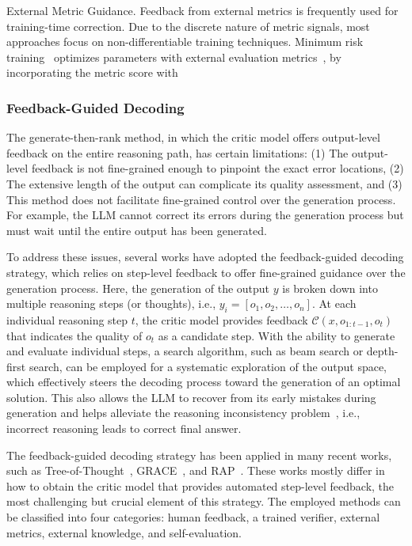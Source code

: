\documentclass[12pt]{extarticle}
\begin{document}
External Metric Guidance. Feedback from external metrics is frequently used for training-time correction. Due to the discrete nature of metric signals, most approaches focus on non-differentiable training techniques. Minimum risk training~\cite{shen-etal-2016-minimum} optimizes parameters with external evaluation metrics~\cite{xu-etal-2022-errors, xu-etal-2023-sescore2}, by incorporating the metric score with

\subsubsection{Feedback-Guided Decoding}
The generate-then-rank method, in which the critic model offers output-level feedback on the entire reasoning path, has certain limitations: (1) The output-level feedback is not fine-grained enough to pinpoint the exact error locations, (2) The extensive length of the output can complicate its quality assessment, and (3) This method does not facilitate fine-grained control over the generation process. For example, the LLM cannot correct its errors during the generation process but must wait until the entire output has been generated.

To address these issues, several works have adopted the feedback-guided decoding strategy, which relies on step-level feedback to offer fine-grained guidance over the generation process. Here, the generation of the output $y$ is broken down into multiple reasoning steps (or thoughts), i.e., $y_{i}=\left[o_{1}, o_{2}, \ldots, o_{n}\right]$. At each individual reasoning step $t$, the critic model provides feedback $\mathcal{C}\left(x, o_{1: t-1}, o_{t}\right)$ that indicates the quality of $o_{t}$ as a candidate step. With the ability to generate and evaluate individual steps, a search algorithm, such as beam search or depth-first search, can be employed for a systematic exploration of the output space, which effectively steers the decoding process toward the generation of an optimal solution. This also allows the LLM to recover from its early mistakes during generation and helps alleviate the reasoning inconsistency problem~\cite{zelikman2022star, creswell2022faithful}, i.e., incorrect reasoning leads to correct final answer.

The feedback-guided decoding strategy has been applied in many recent works, such as Tree-of-Thought~\cite{yao2023tree}, GRACE~\cite{khalifa2023grace}, and RAP~\cite{hao2023reasoning}. These works mostly differ in how to obtain the critic model that provides automated step-level feedback, the most challenging but crucial element of this strategy. The employed methods can be classified into four categories: human feedback, a trained verifier, external metrics, external knowledge, and self-evaluation.
\end{document}
